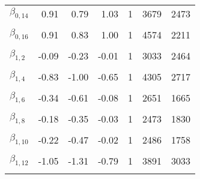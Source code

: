 \begin{table}
\begin{tabular}[t]{lrrrrrr}
$\beta_{0, 14}$ & 0.91 & 0.79 & 1.03 & 1 & 3679 & 2473\\
\cellcolor{gray!6}{$\beta_{0, 15}$} & \cellcolor{gray!6}{1.08} & \cellcolor{gray!6}{1.01} & \cellcolor{gray!6}{1.16} & \cellcolor{gray!6}{1} & \cellcolor{gray!6}{4350} & \cellcolor{gray!6}{3125}\\
$\beta_{0, 16}$ & 0.91 & 0.83 & 1.00 & 1 & 4574 & 2211\\
\cellcolor{gray!6}{$\beta_{1, 1}$} & \cellcolor{gray!6}{-0.34} & \cellcolor{gray!6}{-0.67} & \cellcolor{gray!6}{-0.05} & \cellcolor{gray!6}{1} & \cellcolor{gray!6}{2211} & \cellcolor{gray!6}{1497}\\
$\beta_{1, 2}$ & -0.09 & -0.23 & -0.01 & 1 & 3033 & 2464\\
\cellcolor{gray!6}{$\beta_{1, 3}$} & \cellcolor{gray!6}{-0.07} & \cellcolor{gray!6}{-0.19} & \cellcolor{gray!6}{0.00} & \cellcolor{gray!6}{1} & \cellcolor{gray!6}{2692} & \cellcolor{gray!6}{1967}\\
$\beta_{1, 4}$ & -0.83 & -1.00 & -0.65 & 1 & 4305 & 2717\\
\cellcolor{gray!6}{$\beta_{1, 5}$} & \cellcolor{gray!6}{-0.85} & \cellcolor{gray!6}{-1.06} & \cellcolor{gray!6}{-0.64} & \cellcolor{gray!6}{1} & \cellcolor{gray!6}{4051} & \cellcolor{gray!6}{2685}\\
$\beta_{1, 6}$ & -0.34 & -0.61 & -0.08 & 1 & 2651 & 1665\\
\cellcolor{gray!6}{$\beta_{1, 7}$} & \cellcolor{gray!6}{-0.83} & \cellcolor{gray!6}{-1.03} & \cellcolor{gray!6}{-0.64} & \cellcolor{gray!6}{1} & \cellcolor{gray!6}{3418} & \cellcolor{gray!6}{2415}\\
$\beta_{1, 8}$ & -0.18 & -0.35 & -0.03 & 1 & 2473 & 1830\\
\cellcolor{gray!6}{$\beta_{1, 9}$} & \cellcolor{gray!6}{-0.77} & \cellcolor{gray!6}{-1.00} & \cellcolor{gray!6}{-0.54} & \cellcolor{gray!6}{1} & \cellcolor{gray!6}{3716} & \cellcolor{gray!6}{2625}\\
$\beta_{1, 10}$ & -0.22 & -0.47 & -0.02 & 1 & 2486 & 1758\\
\cellcolor{gray!6}{$\beta_{1, 11}$} & \cellcolor{gray!6}{-0.75} & \cellcolor{gray!6}{-1.00} & \cellcolor{gray!6}{-0.49} & \cellcolor{gray!6}{1} & \cellcolor{gray!6}{3397} & \cellcolor{gray!6}{2234}\\
$\beta_{1, 12}$ & -1.05 & -1.31 & -0.79 & 1 & 3891 & 3033\\
\cellcolor{gray!6}{$\beta_{1, 13}$} & \cellcolor{gray!6}{-0.08} & \cellcolor{gray!6}{-0.21} & \cellcolor{gray!6}{-0.01} & \cellcolor{gray!6}{1} & \cellcolor{gray!6}{3029} & \cellcolor{gray!6}{2191}\\

\end{tabular}
\end{table}
